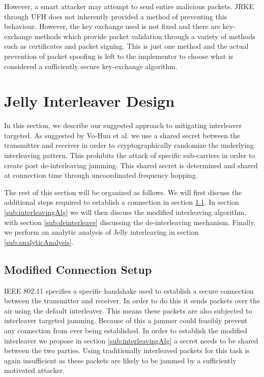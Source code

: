 \documentclass[sigconf]{acmart}
\begin{document}
However, a smart attacker may attempt to send entire malicious packets. JRKE through UFH does not inherently provided a method of preventing this behaviour. However, the key exchange used is not fixed and there are key-exchange methods which provide packet validation through a variety of methods such as certificates and packet signing. This is just one method and the actual prevention of packet spoofing is left to the implementer to choose what is considered a sufficiently secure key-exchange algorithm.

\section{Jelly Interleaver Design}
\label{sec:interleaver_design}

In this section, we describe our suggested approach to mitigating interleaver targeted. As suggested by Vo-Huu et al. we use a shared secret between the transmitter and receiver in order to cryptographically randomize the underlying interleaving pattern\cite{vo2016interleaving}. This prohibits the attack of specific sub-carriers in order to create post de-interleaving jamming. This shared secret is determined and shared at connection time through uncoordinated frequency hopping. 

The rest of this section will be organized as follows. We will first discuss the additional steps required to establish a connection in section \ref{sub:setup}. In section \ref{sub:interleavingAlg} we will then discuss the modified interleaving algorithm, with section \ref{sub:deinterleave} discussing the de-interleaving mechanism. Finally, we perform an analytic analysis of Jelly interleaving in section \ref{sub:analyticAnalysis}.

\subsection{Modified Connection Setup}
\label{sub:setup}

IEEE 802.11 specifies a specific handshake used to establish a secure connection between the transmitter and receiver. In order to do this it sends packets over the air using the default interleaver\cite{cooklev2004wireless}. This means these packets are also subjected to interleaver targeted jamming. Because of this a jammer could feasibly prevent any connection from ever being established. In order to establish the modified interleaver we propose in section \ref{sub:interleavingAlg} a secret needs to be shared between the two parties. Using traditionally interleaved packets for this task is again insufficient as these packets are likely to be jammed by a sufficiently motivated attacker. 
\end{document}
